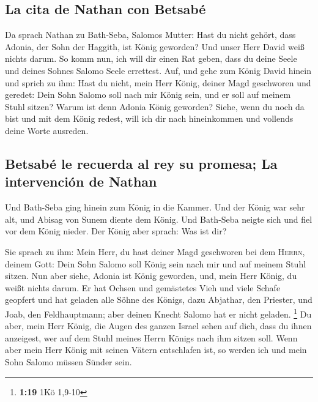 \hypertarget{la-cita-de-nathan-con-betsabuxe9}{%
\subsection{La cita de Nathan con
Betsabé}\label{la-cita-de-nathan-con-betsabuxe9}}

 Da sprach Nathan zu Bath-Seba, Salomos Mutter: Hast du
nicht gehört, dass Adonia, der Sohn der Haggith, ist König geworden? Und
unser Herr David weiß nichts darum.  So komm nun, ich
will dir einen Rat geben, dass du deine Seele und deines Sohnes Salomo
Seele errettest.  Auf, und gehe zum König David hinein
und sprich zu ihm: Hast du nicht, mein Herr König, deiner Magd
geschworen und geredet: Dein Sohn Salomo soll nach mir König sein, und
er soll auf meinem Stuhl sitzen? Warum ist denn Adonia König geworden?
 Siehe, wenn du noch da bist und mit dem König redest,
will ich dir nach hineinkommen und vollends deine Worte ausreden.

\hypertarget{betsabuxe9-le-recuerda-al-rey-su-promesa-la-intervenciuxf3n-de-nathan}{%
\subsection{Betsabé le recuerda al rey su promesa; La intervención de
Nathan}\label{betsabuxe9-le-recuerda-al-rey-su-promesa-la-intervenciuxf3n-de-nathan}}

 Und Bath-Seba ging hinein zum König in die Kammer. Und
der König war sehr alt, und Abisag von Sunem diente dem König.
 Und Bath-Seba neigte sich und fiel vor dem König nieder.
Der König aber sprach: Was ist dir?

 Sie sprach zu ihm: Mein Herr, du hast deiner Magd
geschworen bei dem \textsc{Herrn}, deinem Gott: Dein Sohn Salomo soll
König sein nach mir und auf meinem Stuhl sitzen.  Nun
aber siehe, Adonia ist König geworden, und, mein Herr König, du weißt
nichts darum.  Er hat Ochsen und gemästetes Vieh und
viele Schafe geopfert und hat geladen alle Söhne des Königs, dazu
Abjathar, den Priester, und Joab, den Feldhauptmann; aber deinen Knecht
Salomo hat er nicht geladen. \footnote{\textbf{1:19} 1Kö 1,9-10}
 Du aber, mein Herr König, die Augen des ganzen Israel
sehen auf dich, dass du ihnen anzeigest, wer auf dem Stuhl meines Herrn
Königs nach ihm sitzen soll.  Wenn aber mein Herr König
mit seinen Vätern entschlafen ist, so werden ich und mein Sohn Salomo
müssen Sünder sein.

